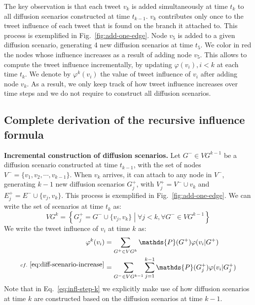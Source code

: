 The key observation is that each tweet $v_k$ is added simultaneously at time $t_k$ to all diffusion scenarios constructed at time $t_{k-1}$.
$v_k$ contributes only once to the tweet influence of each tweet that is found on the branch it attached to.
This process is exemplified in Fig.~\ref{fig:add-one-edge}.
Node $v_5$ is added to a given diffusion scenario, generating 4 new diffusion scenarios at time $t_5$.
We color in red the nodes whose influence increases as a result of adding node $v_5$.
%
This allows to compute the tweet influence incrementally, by updating $\varphi(v_i), i < k$ at each time $t_k$.
We denote by $\varphi^k(v_i)$ the value of tweet influence of $v_i$ after adding node $v_k$.
As a result, we only keep track of how tweet influence increases over time steps and we do not require to construct all diffusion scenarios.

\subsection{Complete derivation of the recursive influence formula}

\textbf{Incremental construction of diffusion scenarios.}
Let $G^- \in VG^{k-1}$ be a diffusion scenario constructed at time $t_{k-1}$, with the set of nodes $V^- = \{ v_1,v_2,\cdots,v_{k-1} \}$.
When $v_k$ arrives, it can attach to any node in $V^-$, generating $k-1$ new diffusion scenarios $G_j^+$, with $V_j^+ = V^- \cup v_k$ and $E_j^+ = E^- \cup \{v_j, v_k\}$.
This process is exemplified in Fig.~\ref{fig:add-one-edge}.
We can write the set of scenarios at time $t_k$ as:
\begin{equation} \label{eq:diff-scenario-increase}
	VG^k = \left\lbrace G_j^+ = G^- \cup \{v_j, v_k\} \middle| \forall j < k, \forall G^- \in VG^{k-1} \right\rbrace
\end{equation}     
We write the tweet influence of $v_i$ at time $k$ as:
%
%
% 
\begin{align}
	\varphi^k(v_i) &= \sum_{G^+ \in {VG^k}} \mathds{P}(G^+) \varphi(v_i|G^+) \nonumber \\
	^{cf.~\eqref{eq:diff-scenario-increase}} &= \sum_{G^- \in {VG^{k-1}}}\sum^{k-1}_{j=1}\mathds{P}(G_j^+) \varphi(v_i|G_j^+) \label{eq:infl-step-k}
\end{align}
Note that in Eq.~\eqref{eq:infl-step-k} we explicitly make use of how diffusion scenarios at time $k$ are constructed based on the diffusion scenarios at time $k-1$.

